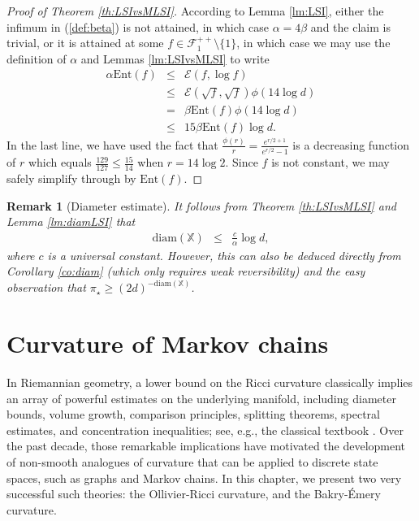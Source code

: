 \documentclass[12pt,final]{article}
\newtheorem{remark}{Remark}[section]
\numberwithin{equation}{section}
\newcommand{\Lip}{\mathrm {Lip}}
\newcommand{\Ent}{\mathrm{Ent}}
\newcommand{\Var}{\mathrm{Var}}
\newcommand{\cE}{\mathscr {E}}
\newcommand{\cF}{\mathcal {F}}
\newcommand{\dX}{\mathbb{X}}
\newcommand{\diam}{\mathrm{diam}}
\begin{document}
\begin{proof}[Proof of Theorem \ref{th:LSIvsMLSI}]According to Lemma \ref{lm:LSI}, either the infimum in (\ref{def:beta}) is not attained, in which case $\alpha=4\beta$ and the claim is trivial, or it is attained at some $f\in\cF^{++}_1\setminus \{1\}$, in which case we may use the definition of $\alpha$ and  Lemmas \ref{lm:LSIvsMLSI} to write  
\begin{eqnarray*}
\alpha\Ent(f) & \le & \cE(f,\log f)\\
& \le & \cE(\sqrt{f},\sqrt{f})\phi(14\log d)\\
& = &  \beta\Ent(f)\phi(14\log d)\\
& \le & 15\beta  \Ent(f)\log d. 
\end{eqnarray*}
In the last line,  we have used the fact that $\frac{\phi(r)}{r}=\frac{e^{r/2+1}}{e^{r/2}-1}$ is a decreasing function of $r$ which equals $\frac{129}{127}\le\frac{15}{14}$ when $r=14\log 2$. Since $f$ is not constant, we may safely simplify through by $\Ent(f)$. 
\end{proof}
\begin{remark}[Diameter estimate]\label{rk:diammls}It follows from Theorem \ref{th:LSIvsMLSI} and Lemma \ref{lm:diamLSI} that
\begin{eqnarray*}
\diam(\dX) & \le & \frac{c}{\alpha}\log d,
\end{eqnarray*} where $c$ is a universal constant. However, this can also be deduced directly from Corollary \ref{co:diam} (which only requires weak reversibility) and  the easy observation that  $\pi_\star\ge (2d)^{-\diam(\dX)}$.
\end{remark}

\newpage
\section{Curvature of Markov chains}
\label{sec:curvature}
In Riemannian geometry, a lower bound  on the Ricci curvature classically  implies an array of powerful estimates on the underlying manifold, including diameter bounds, volume growth, comparison principles, splitting theorems, spectral estimates, and concentration inequalities; see, e.g., the classical textbook \cite{MR3726907}. Over the past decade, those remarkable implications have motivated the development of non-smooth analogues of curvature that can be applied to discrete state spaces, such as graphs and Markov chains. In this chapter, we present two very successful such theories: the Ollivier-Ricci curvature, and the Bakry-\'Emery curvature. 
\end{document}
